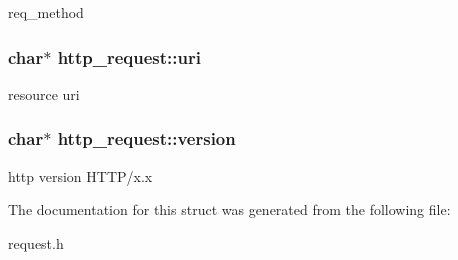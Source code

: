 \label{structhttp__request_a9c335e7e58b388eebbc47566bac7ccf8}
req\_\-method \hypertarget{structhttp__request_a4e9a04ec2dbeaa73b61021d4ef643e46}{
\subsubsection[{uri}]{\setlength{\rightskip}{0pt plus 5cm}char$\ast$ {\bf http\_\-request::uri}}}
\label{structhttp__request_a4e9a04ec2dbeaa73b61021d4ef643e46}
resource uri \hypertarget{structhttp__request_afe666e8ccf16d468d71ec116914d6432}{
\subsubsection[{version}]{\setlength{\rightskip}{0pt plus 5cm}char$\ast$ {\bf http\_\-request::version}}}
\label{structhttp__request_afe666e8ccf16d468d71ec116914d6432}
http version HTTP/x.x 

The documentation for this struct was generated from the following file:\begin{DoxyCompactItemize}
\item 
request.h\end{DoxyCompactItemize}
